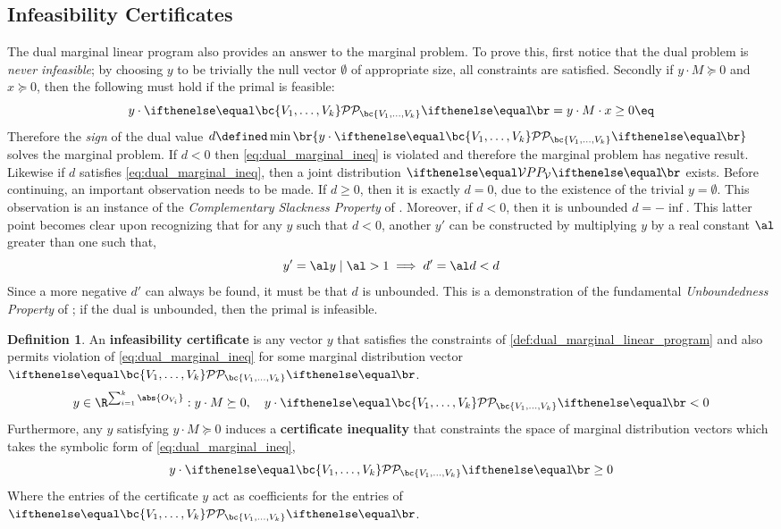 \documentclass[aps, 10pt, english, twoside, pra, nofootinbib, longbibliography]{revtex4-1}
\theoremstyle{plain}
\theoremstyle{definition}
\newtheorem{definition}[theorem]{Definition}
\theoremstyle{remark}
\newcommand{\term}[1]{\textcolor{Mahogany}{\textbf{#1}}}
\begin{document}
    \subsection{Infeasibility Certificates}
    The dual marginal linear program also provides an answer to the marginal problem. To prove this, first notice that the dual problem is \textit{never infeasible}; by choosing $y$ to be trivially the null vector $\emptyset$ of appropriate size, all constraints are satisfied. Secondly if $y \cdot M \succeq 0$ and $x \succeq 0$, then the following must hold if the primal is feasible:
    \[ y \cdot \probvec[\bc{V_1, \ldots, V_k}] =  y \cdot M \cdot x \geq 0 \eq \label{eq:dual_marginal_ineq} \]
    Therefore the \textit{sign} of the dual value $d \defined \min \br{y \cdot \probvec[\bc{V_1, \ldots, V_k}]}$ solves the marginal problem. If $d < 0$ then \cref{eq:dual_marginal_ineq} is violated and therefore the marginal problem has negative result. Likewise if $d$ satisfies \cref{eq:dual_marginal_ineq}, then a joint distribution $\prob[\mathcal{V}]$ exists. Before continuing, an important observation needs to be made. If $d \geq 0$, then it is exactly $d = 0$, due to the existence of the trivial $y = \emptyset$. This observation is an instance of the \textit{Complementary Slackness Property} of \cite{Bradley_1977}.  Moreover, if $d < 0$, then it is unbounded $d = -\inf$. This latter point becomes clear upon recognizing that for any $y$ such that $d < 0$, another $y'$ can be constructed by multiplying $y$ by a real constant $\al$ greater than one such that,
    \[ y' = \al y \mid \al > 1 \implies d' = \al d < d \]
    Since a more negative $d'$ can always be found, it must be that $d$ is unbounded. This is a demonstration of the fundamental \textit{Unboundedness Property} of \cite{Bradley_1977}; if the dual is unbounded, then the primal is infeasible.


    \begin{definition} An \term{infeasibility certificate} is any vector $y$ that satisfies the constraints of \cref{def:dual_marginal_linear_program} and also permits violation of \cref{eq:dual_marginal_ineq} for some marginal distribution vector $\probvec[\bc{V_1, \ldots, V_k}]$.
    \[ y \in \R^{\sum_{i=1}^{k} \abs{O_{V_i}}} : y \cdot M \succeq 0, \quad y \cdot \probvec[\bc{V_1, \ldots, V_k}] < 0 \]
    Furthermore, any $y$ satisfying $y \cdot M \succeq 0$ induces a \term{certificate inequality} that constraints the space of marginal distribution vectors which takes the symbolic form of \cref{eq:dual_marginal_ineq},
    \[ y \cdot \probvec[\bc{V_1, \ldots, V_k}] \geq 0 \]
    Where the entries of the certificate $y$ act as coefficients for the entries of $\probvec[\bc{V_1, \ldots, V_k}]$.
    \end{definition}
\end{document}
